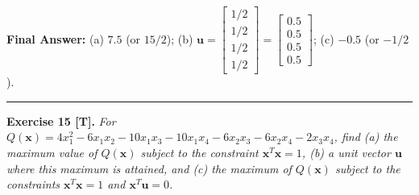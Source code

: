 \documentclass[11pt, letterpaper]{article}
\theoremstyle{definition}
\theoremstyle{remark}
\begin{document}
\textbf{Final Answer:} (a) $7.5$ (or $15/2$); \quad (b) $\mathbf{u} = \begin{bmatrix} 1/2 \\ 1/2 \\ 1/2 \\ 1/2 \end{bmatrix} = \begin{bmatrix} 0.5 \\ 0.5 \\ 0.5 \\ 0.5 \end{bmatrix}$; \quad (c) $-0.5$ (or $-1/2$).

\medskip
\hrule
\medskip

\textbf{Exercise 15 [T].} \emph{For $Q(\mathbf{x}) = 4x_1^2 - 6x_1x_2 - 10x_1x_3 - 10x_1x_4 - 6x_2x_3 - 6x_2x_4 - 2x_3x_4$, find (a) the maximum value of $Q(\mathbf{x})$ subject to the constraint $\mathbf{x}^T\mathbf{x} = 1$, (b) a unit vector $\mathbf{u}$ where this maximum is attained, and (c) the maximum of $Q(\mathbf{x})$ subject to the constraints $\mathbf{x}^T\mathbf{x} = 1$ and $\mathbf{x}^T\mathbf{u} = 0$.}
\end{document}
